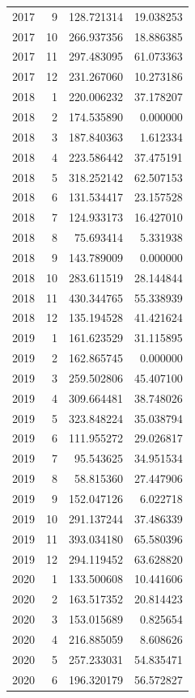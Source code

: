 \begin{tabular}{rrrr}
2017 & 9 & 128.721314 & 19.038253 \\
2017 & 10 & 266.937356 & 18.886385 \\
2017 & 11 & 297.483095 & 61.073363 \\
2017 & 12 & 231.267060 & 10.273186 \\
2018 & 1 & 220.006232 & 37.178207 \\
2018 & 2 & 174.535890 & 0.000000 \\
2018 & 3 & 187.840363 & 1.612334 \\
2018 & 4 & 223.586442 & 37.475191 \\
2018 & 5 & 318.252142 & 62.507153 \\
2018 & 6 & 131.534417 & 23.157528 \\
2018 & 7 & 124.933173 & 16.427010 \\
2018 & 8 & 75.693414 & 5.331938 \\
2018 & 9 & 143.789009 & 0.000000 \\
2018 & 10 & 283.611519 & 28.144844 \\
2018 & 11 & 430.344765 & 55.338939 \\
2018 & 12 & 135.194528 & 41.421624 \\
2019 & 1 & 161.623529 & 31.115895 \\
2019 & 2 & 162.865745 & 0.000000 \\
2019 & 3 & 259.502806 & 45.407100 \\
2019 & 4 & 309.664481 & 38.748026 \\
2019 & 5 & 323.848224 & 35.038794 \\
2019 & 6 & 111.955272 & 29.026817 \\
2019 & 7 & 95.543625 & 34.951534 \\
2019 & 8 & 58.815360 & 27.447906 \\
2019 & 9 & 152.047126 & 6.022718 \\
2019 & 10 & 291.137244 & 37.486339 \\
2019 & 11 & 393.034180 & 65.580396 \\
2019 & 12 & 294.119452 & 63.628820 \\
2020 & 1 & 133.500608 & 10.441606 \\
2020 & 2 & 163.517352 & 20.814423 \\
2020 & 3 & 153.015689 & 0.825654 \\
2020 & 4 & 216.885059 & 8.608626 \\
2020 & 5 & 257.233031 & 54.835471 \\
2020 & 6 & 196.320179 & 56.572827 \\

\end{tabular}
